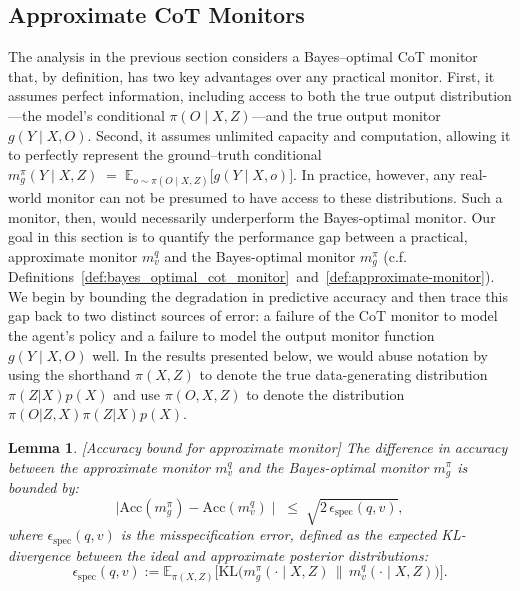 \documentclass{article}
\theoremstyle{plain}
\newtheorem{lemma}[theorem]{Lemma}
\begin{document}
\subsection{Approximate CoT Monitors}
\label{subsec:practical-monitors}
The analysis in the previous section considers a Bayes–optimal CoT monitor that, by definition, has two key advantages over any practical monitor.
First, it assumes perfect information, including access to both the true output distribution—the model’s conditional \(\pi(O \mid X, Z)\)—and the true output monitor \(g(Y \mid X, O)\).
Second, it assumes unlimited capacity and computation, allowing it to perfectly represent the ground–truth conditional
\(
m_g^{\pi}(Y \mid X, Z)\;=\;\mathbb{E}_{o\sim \pi(O\mid X,Z)}\!\big[g(Y\mid X,o)\big]
\).
In practice, however, any real-world monitor can not be presumed to have access to these distributions.
Such a monitor, then, would necessarily underperform the Bayes-optimal monitor.
Our goal in this section is to quantify the performance gap between a practical, approximate monitor \(m_v^q\) and the Bayes-optimal monitor \(m_g^\pi\) (c.f. Definitions~\ref{def:bayes_optimal_cot_monitor}~and~\ref{def:approximate-monitor}).
We begin by bounding the degradation in predictive accuracy and then trace this gap back to two distinct sources of error: a failure of the CoT monitor to model the agent's policy and a failure to model the output monitor function \(g(Y \mid X, O)\) well.
In the results presented below, we would abuse notation by using the shorthand $\pi(X,Z)$ to denote the true data-generating distribution $\pi(Z|X)p(X)$ and use $\pi(O,X,Z)$ to denote the distribution $\pi(O|Z,X)\pi(Z|X)p(X)$.


\begin{lemma}
\label{prop:accuracy-01}[Accuracy bound for approximate monitor]
The difference in accuracy between the approximate monitor $m_v^q$ and the Bayes-optimal monitor $m_g^\pi$ is bounded by:
\begin{equation}
\label{eq:acc-01-bound}
\mid \mathrm{Acc}(m_g^{\pi})-\mathrm{Acc}(m_v^q) \mid
\;\le\;
\sqrt{2\,\epsilon_{\mathrm{spec}}(q,v)},
\end{equation}
where $\epsilon_{\mathrm{spec}}(q,v)$ is the \emph{misspecification error}, defined as the expected KL-divergence between the ideal and approximate posterior distributions:
\[
\epsilon_{\mathrm{spec}}(q,v) := \mathbb{E}_{\pi(X,Z)} \big[ \mathrm{KL}\!\big(m_g^{\pi}(\cdot\mid X,Z)\,\big\|\,m_v^{q}(\cdot\mid X,Z)\big) \big].
\]
\end{lemma}
\end{document}
